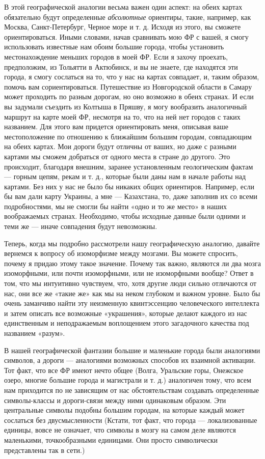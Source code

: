 \documentclass[../main.tex]{subfiles}
\begin{document}
В этой географической аналогии весьма важен один аспект: на обеих картах обязательно будут определенные \emph{абсолютные} ориентиры, такие, например, как Москва, Санкт-Петербург, Черное море и т. д. Исходя из этого, вы сможете ориентироваться. Иными словами, начав сравнивать мою ФР с вашей, я смогу использовать известные нам обоим большие города, чтобы установить местонахождение меньших городов в моей ФР. Если я захочу проехать, предположим, из Тольятти в Актюбинск, и вы не знаете, где находятся эти города, я смогу сослаться на то, что у нас на картах совпадает, и, таким образом, помочь вам сориентироваться. Путешествие из Новгородской области в Самару может проходить по разным дорогам, но оно возможно в обеих странах. И если вы задумали съездить из Колтыша в Пряшву, я могу вообразить аналогичный маршрут на карте моей ФР, несмотря на то, что на ней нет городов с таких названием. Для этого вам придется ориентировать меня, описывая ваше местоположение по отношению к ближайшим большим городам, совпадающим на обеих картах. Мои дороги будут отличны от ваших, но даже с разными картами мы сможем добраться от одного места в стране до другого. Это происходит, благодаря внешним, заранее установленным геологическим фактам --- горным цепям, рекам и т. д., которые были даны нам в начале работы над картами. Без них у нас не было бы никаких общих ориентиров. Например, если бы вам дали карту Украины, а мне --- Казахстана, то, даже заполнив их со всеми подробностями, мы не смогли бы найти «одно и то же место» в наших воображаемых странах. Необходимо, чтобы исходные данные были одними и теми же --- иначе совпадения будут невозможны.

Теперь, когда мы подробно рассмотрели нашу географическую аналогию, давайте вернемся к вопросу об изоморфизме между мозгами. Вы можете спросить, почему я придаю этому такое значение. Почему так важно, являются ли два мозга изоморфными, или почти изоморфными, или не изоморфными вообще? Ответ в том, что мы интуитивно чувствуем, что, хотя другие люди сильно отличаются от нас, они все же «такие же» как мы на неком глубоком и важном уровне. Было бы очень заманчиво найти эту неизменную квинтэссенцию человеческого интеллекта и затем описать все возможные «украшения», которые делают каждого из нас единственным и неподражаемым воплощением этого загадочного качества под названием «разум».

В нашей географической фантазии большие и маленькие города были аналогиями символов, а дороги --- аналогиями возможных способов их взаимной активации. Тот факт, что все ФР имеют нечто общее (Волга, Уральские горы, Онежское озеро, многие большие города и магистрали и т. д.) аналогичен тому, что всем нам приходится по не зависящим от нас обстоятельствам создавать определенные символы-классы и дороги-связи между ними одинаковым образом. Эти центральные символы подобны большим городам, на которые каждый может сослаться без двусмысленности (Кстати, тот факт, что города --- локализованные единицы, вовсе не означает, что символы в мозгу на самом деле являются маленькими, точкообразными единицами. Они просто символически представлены так в сети.)
\end{document}
